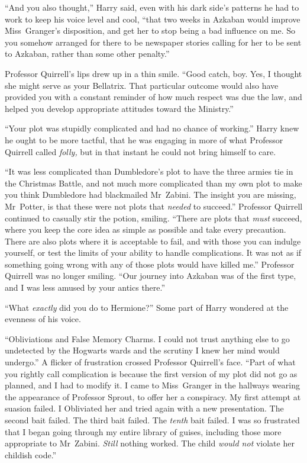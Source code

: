 “And you also thought,” Harry said, even with his dark side’s patterns he had to work to keep his voice level and cool, “that two weeks in Azkaban would improve Miss~Granger’s disposition, and get her to stop being a bad influence on me. So you somehow arranged for there to be newspaper stories calling for her to be sent to Azkaban, rather than some other penalty.”

Professor Quirrell’s lips drew up in a thin smile. “Good catch, boy. Yes, I thought she might serve as your Bellatrix. That particular outcome would also have provided you with a constant reminder of how much respect was due the law, and helped you develop appropriate attitudes toward the Ministry.”

“Your plot was stupidly complicated and had no chance of working.” Harry knew he ought to be more tactful, that he was engaging in more of what Professor Quirrell called \emph{folly,} but in that instant he could not bring himself to care.

“It was less complicated than Dumbledore’s plot to have the three armies tie in the Christmas Battle, and not much more complicated than my own plot to make you think Dumbledore had blackmailed Mr~Zabini. The insight you are missing, Mr~Potter, is that these were not plots that \emph{needed} to succeed.” Professor Quirrell continued to casually stir the potion, smiling. “There are plots that \emph{must} succeed, where you keep the core idea as simple as possible and take every precaution. There are also plots where it is acceptable to fail, and with those you can indulge yourself, or test the limits of your ability to handle complications. It was not as if something going wrong with any of those plots would have killed me.” Professor Quirrell was no longer smiling. “Our journey into Azkaban was of the first type, and I was less amused by your antics there.”

“What \emph{exactly} did you do to Hermione?” Some part of Harry wondered at the evenness of his voice.

“Obliviations and False Memory Charms. I could not trust anything else to go undetected by the Hogwarts wards and the scrutiny I knew her mind would undergo.” A flicker of frustration crossed Professor Quirrell’s face. “Part of what you rightly call complication is because the first version of my plot did not go as planned, and I had to modify it. I came to Miss~Granger in the hallways wearing the appearance of Professor Sprout, to offer her a conspiracy. My first attempt at suasion failed. I Obliviated her and tried again with a new presentation. The second bait failed. The third bait failed. The \emph{tenth} bait failed. I was so frustrated that I began going through my entire library of guises, including those more appropriate to Mr~Zabini. \emph{Still} nothing worked. The child \emph{would not} violate her childish code.”

